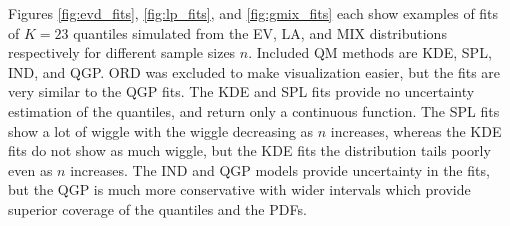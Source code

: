 \documentclass[preprint,12pt,authoryear]{elsarticle}
\begin{document}
Figures \ref{fig:evd_fits}, \ref{fig:lp_fits},  and \ref{fig:gmix_fits} each show examples of fits of $K=23$ quantiles simulated from the EV, LA, and MIX distributions respectively for different sample sizes $n$. Included QM methods are KDE, SPL, IND, and QGP. ORD was excluded to make visualization easier, but the fits are very similar to the QGP fits. The KDE and SPL fits provide no uncertainty estimation of the quantiles, and return only a continuous function. The SPL fits show a lot of wiggle with the wiggle decreasing as $n$ increases, whereas the KDE fits do not show as much wiggle, but the KDE fits the distribution tails poorly even as $n$ increases. The IND and QGP models provide uncertainty in the fits, but the QGP is much more conservative with wider intervals which provide superior coverage of the quantiles and the PDFs. 
\end{document}
